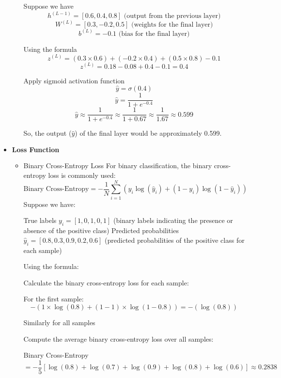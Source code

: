\begin{itemize}
\begin{itemize}
Suppose we have
\[
h^{(L-1)} = [0.6, 0.4, 0.8] \text{ (output from the previous layer)}
\]
\[
W^{(L)} = [0.3, -0.2, 0.5] \text{ (weights for the final layer)}
\]
\[
b^{(L)} = -0.1 \text{ (bias for the final layer)}
\]

Using the formula
\[
z^{(L)} = (0.3 \times 0.6) + (-0.2 \times 0.4) + (0.5 \times 0.8) - 0.1
\]
\[
z^{(L)} = 0.18 - 0.08 + 0.4 - 0.1 = 0.4
\]

Apply sigmoid activation function
\[
\hat{y} = \sigma(0.4)
\]
\[
\hat{y} = \frac{1}{1 + e^{-0.4}}
\]
\[
\hat{y} \approx \frac{1}{1 + e^{-0.4}} \approx \frac{1}{1 + 0.67} \approx \frac{1}{1.67} \approx 0.599
\]

So, the output (\( \hat{y} \)) of the final layer would be approximately 0.599.

\end{itemize}

\item{\textbf{Loss Function}}
\begin{itemize}
    \item{Binary Cross-Entropy Loss}
For binary classification, the binary cross-entropy loss is commonly used:
\begin{equation}
\text{Binary Cross-Entropy} = -\frac{1}{N} \sum_{i=1}^N \left(y_i \log(\hat{y}_i) + (1 - y_i) \log(1 - \hat{y}_i)\right)
\end{equation}
Suppose we have:

True labels \( y_i = [1, 0, 1, 0, 1] \) (binary labels indicating the presence or absence of the positive class)
Predicted probabilities \( \hat{y}_i = [0.8, 0.3, 0.9, 0.2, 0.6] \) (predicted probabilities of the positive class for each sample)

Using the formula:

Calculate the binary cross-entropy loss for each sample:

For the first sample: 
\[
- (1 \times \log(0.8) + (1 - 1) \times \log(1 - 0.8)) = - (\log(0.8))
\]

Similarly for all samples

Compute the average binary cross-entropy loss over all samples:

Binary Cross-Entropy
\[
= - \frac{1}{5} \left[ \log(0.8) + \log(0.7) + \log(0.9) + \log(0.8) + \log(0.6) \right]\approx 0.2838\]


\end{itemize}
\end{itemize}
